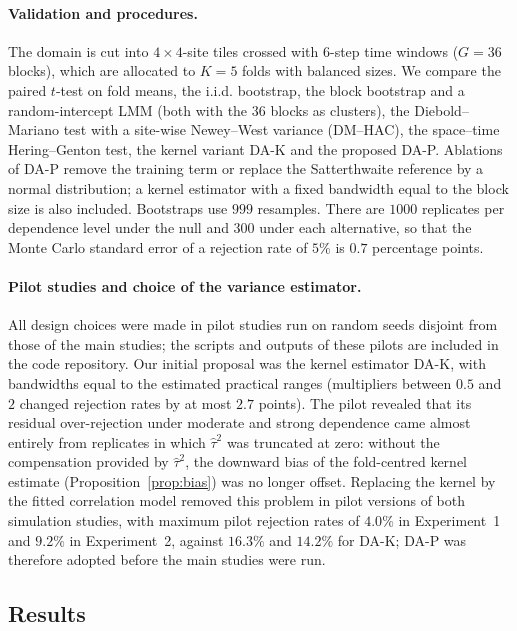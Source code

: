 \paragraph{Validation and procedures.} The domain is cut into $4\times4$-site tiles crossed with $6$-step time windows ($G=36$ blocks), which are allocated to $K=5$ folds with balanced sizes. We compare the paired $t$-test on fold means, the i.i.d. bootstrap, the block bootstrap and a random-intercept LMM (both with the $36$ blocks as clusters), the Diebold--Mariano test with a site-wise Newey--West variance (DM--HAC), the space--time Hering--Genton test, the kernel variant DA-K and the proposed DA-P. Ablations of DA-P remove the training term or replace the Satterthwaite reference by a normal distribution; a kernel estimator with a fixed bandwidth equal to the block size is also included. Bootstraps use $999$ resamples. There are $1000$ replicates per dependence level under the null and $300$ under each alternative, so that the Monte Carlo standard error of a rejection rate of $5\%$ is $0.7$ percentage points.

\paragraph{Pilot studies and choice of the variance estimator.} All design choices were made in pilot studies run on random seeds disjoint from those of the main studies; the scripts and outputs of these pilots are included in the code repository. Our initial proposal was the kernel estimator DA-K, with bandwidths equal to the estimated practical ranges (multipliers between $0.5$ and $2$ changed rejection rates by at most $2.7$ points). The pilot revealed that its residual over-rejection under moderate and strong dependence came almost entirely from replicates in which $\hat\tau^2$ was truncated at zero: without the compensation provided by $\hat\tau^2$, the downward bias of the fold-centred kernel estimate (Proposition~\ref{prop:bias}) was no longer offset. Replacing the kernel by the fitted correlation model removed this problem in pilot versions of both simulation studies, with maximum pilot rejection rates of $4.0\%$ in Experiment~1 and $9.2\%$ in Experiment~2, against $16.3\%$ and $14.2\%$ for DA-K; DA-P was therefore adopted before the main studies were run.

\subsection{Results}

